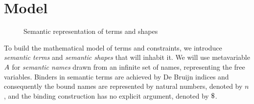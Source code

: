 \documentclass[english, mgr]{iithesis}
\renewcommand{\it}[1]{\textit{#1}}
\begin{document}
\section{Model}
\begin{figure}[htbp]
  \centering
  \caption{Semantic representation of terms and shapes}
  \label{fig:semantic-terms-shapes}
\end{figure}
To build the mathematical model of terms and constraints,
we introduce \it{semantic terms} and \it{semantic shapes} that will inhabit it.
We will use metavariable $A$ for \it{semantic names} drawn from an
infinite set of names, representing the free variables.
Binders in semantic terms are achieved by De Bruijn indices\cite{deBruijn} and consequently
the bound names are represented by natural numbers, denoted by $n$,
and the binding construction has no explicit argument, denoted by $\stbind$.
\end{document}
